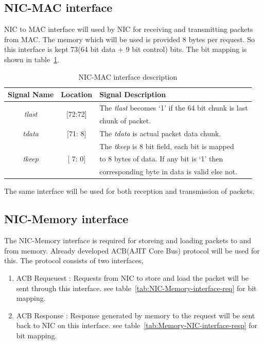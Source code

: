 \documentclass[12pt]{report}
\begin{document}
\begin{appendices}
		\subsection{NIC-MAC interface}
			NIC to MAC interface will used by NIC for receiving and transmitting packets from MAC. The memory which will be used is provided 8 bytes per request.
			So this interface is kept 73(64 bit data + 9 bit control) bits. The bit mapping is shown in table~\ref{tab:NIC-MAC-interface}.
				\begin{table}[!htbp]
					\centering
					\begin{tabular}{ccl}
						\hline
						\textbf{Signal Name} & \textbf{Location} &\textbf{Signal Description}  \\ \hline
						\multirow{2}{*}{\textit{tlast}}	& \multirow{2}{*}{[72:72]}	& The \textit{tlast} becomes `1' if the 64 bit chunk is last\\
										& 				& chunk of packet.\\ \hline
						\textit{tdata}   		& [71: 8] 			& The \textit{tdata} is actual packet data chunk.\\ \hline
						\multirow{3}{*}{\textit{tkeep}}	& \multirow{3}{*}{[ 7: 0]}	& The \textit{tkeep} is 8 bit field, each bit is mapped\\
										&				& to 8 bytes of data. If any bit is `1' then\\
										& 				& corresponding byte in data is valid else not.\\ \hline 
					\end{tabular}
					\caption{NIC-MAC interface description}
					\label{tab:NIC-MAC-interface}
				\end{table}
			The same interface will be used for both reception and transmission of packets.

		\subsection{NIC-Memory interface}
			The NIC-Memory interface is required for storeing and loading packets to and from memory. Already developed ACB(AJIT Core Bus) protocol will be used for this.
                        The protocol consists of two interfaces,
			\begin{enumerate}
				\item ACB Requeuest : Requests from NIC to store and load the packet will be sent through this interface. see table~\ref{tab:NIC-Memory-interface-req} for bit mapping.
				\item ACB Response : Response generated by memory to the request will be sent back to NIC on this interface. see table~\ref{tab:Memory-NIC-interface-resp} for bit mapping.
			\end{enumerate}


\end{appendices}
\end{document}
